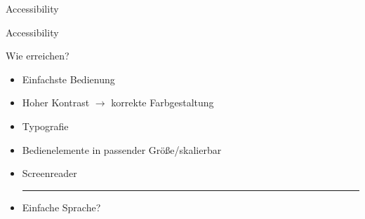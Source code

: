 

\begin{subsection}{Accessibility}
\begin{frame}{Accessibility}

\pause

\begin{question}[Frage]
Wie erreichen?
\end{question}

\pause

\begin{itemize}[<+->]

\item Einfachste Bedienung
\item Hoher Kontrast $\rightarrow$ korrekte Farbgestaltung
\item Typografie
\item Bedienelemente in passender Größe/skalierbar
\item Screenreader

\noindent\rule{\linewidth}{0.4pt}
\pause

\item Einfache Sprache?

\end{itemize}

\end{frame}
\end{subsection} %






